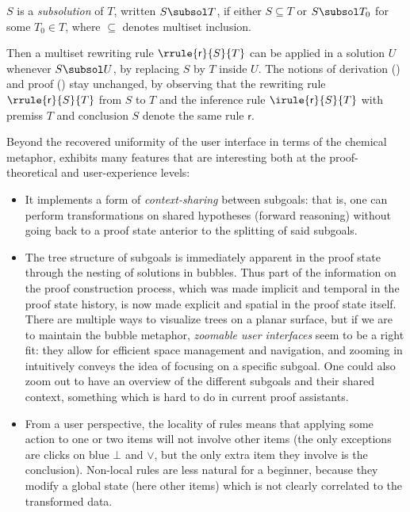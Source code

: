 \begin{definition}[Subsolution]
  $S$ is a \emph{subsolution} of $T$, written $S \subsol T$, if either $S
  \subseteq T$ or $S \subsol T_0$ for some $T_0 \in T$, where $\subseteq$
  denotes multiset inclusion. 
\end{definition}

Then a multiset rewriting rule $\rrule{\mathsf{r}}{S}{T}$ can be applied in a
solution $U$ whenever $S \subsol U$, by replacing $S$ by $T$ inside $U$. The
notions of derivation () and proof () stay
unchanged, by observing that the rewriting rule $\rrule{\mathsf{r}}{S}{T}$ from
$S$ to $T$ and the inference rule $\irule{\mathsf{r}}{S}{T}$ with premiss $T$
and conclusion $S$ denote the same rule $\mathsf{r}$.

Beyond the recovered uniformity of the user interface in terms of the chemical
metaphor,  exhibits many features that are interesting both at the
proof-theoretical and user-experience levels:
\begin{itemize}
  \item It implements a form of \emph{context-sharing} between subgoals: that
    is, one can perform transformations on shared hypotheses (forward reasoning)
    without going back to a proof state anterior to the splitting of said
    subgoals.
  \item The tree structure of subgoals is immediately apparent in the proof
    state through the nesting of solutions in bubbles. Thus part of the
    information on the proof construction process, which was made implicit and
    temporal in the proof state history, is now made explicit and spatial in the
    proof state itself. There are multiple ways to visualize trees on a planar surface, but
    if we are to maintain the bubble metaphor, \emph{zoomable user interfaces}
    seem to be a right fit: they allow for efficient space management and
    navigation, and zooming in intuitively conveys the idea of focusing on a
    specific subgoal. One could also zoom out to have an overview of the
    different subgoals and their shared context, something which is hard to do
    in current proof assistants.
  \item From a user perspective, the locality of rules means that applying some
    action to one or two items will not involve other items (the only exceptions
    are clicks on blue $\bot$ and $\lor$, but the only extra item they involve
    is the conclusion). Non-local rules are less natural for a beginner, because
    they modify a global state (here other items) which is not clearly
    correlated to the transformed data.
\end{itemize}

